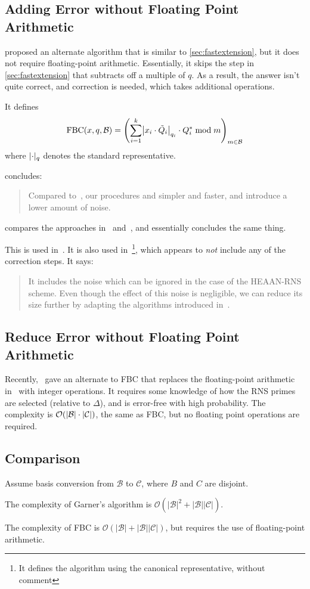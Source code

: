 \documentclass[../keyswitching.tex]{subfiles}
\begin{document}
\subsection{Adding Error without Floating Point Arithmetic}
\label{sec:basisExtErr}
\cite{cryptoeprint:2016/510} proposed an alternate algorithm that is similar to \cref{sec:fastextension}, but it does not require floating-point arithmetic. Essentially, it skips the step in \cref{sec:fastextension} that subtracts off a multiple of $q$. As a result, the answer isn't quite correct, and correction is needed, which takes additional operations.

It defines
\[\mathrm{FBC}(x,q,\mathcal{B}) = \parens*{
	\sum_{i=1}^k \abs*{x_i\cdot \tilde{Q}_i}_{q_i}\cdot Q_i^*\bmod m}_{m\in\mathcal{B}}\]
where $\lvert\cdot\rvert_q$ denotes the standard representative.

\cite{cryptoeprint:2018/117} concludes:

\blockquote{Compared to~\cite{cryptoeprint:2016/510}, our procedures and simpler and faster, and introduce a lower amount of noise.}

\cite{cryptoeprint:2018/589} compares the approaches in~\cite{cryptoeprint:2016/510} and~\cite{cryptoeprint:2018/117}, and essentially concludes the same thing.

This is used in~\cite{cryptoeprint:2018/931}. It is also used in~\cite{cryptoeprint:2019/688}\footnote{It defines the algorithm using the canonical representative, without comment}, which appears to \emph{not} include any of the correction steps. It says:

\blockquote{It includes the noise which can be ignored in the case of the \textrm{HEAAN-RNS} scheme. Even though the effect of this noise is negligible, we can reduce its size further by adapting the algorithms introduced in~\cite{cryptoeprint:2018/117}.}

\subsection{Reduce Error without Floating Point Arithmetic}
Recently,~\cite{cryptoeprint:2024/417} gave an alternate to FBC that replaces the floating-point arithmetic in~\cite{cryptoeprint:2018/117} with integer operations. It requires some knowledge of how the RNS primes are selected (relative to $\Delta$), and is error-free with high probability. The complexity is $\mathcal{O}(\lvert\mathcal{B}\rvert\cdot\lvert\mathcal{C}\rvert)$, the same as FBC, but no floating point operations are required.

\subsection{Comparison}
Assume basis conversion from $\mathcal{B}$ to $\mathcal{C}$, where $B$ and $C$ are disjoint.

The complexity of Garner's algorithm is $\mathcal{O}(|\mathcal{B}|^2+|\mathcal{B}||\mathcal{C}|)$.

The complexity of FBC is $\mathcal{O}(|\mathcal{B}|+|\mathcal{B}||\mathcal{C}|)$, but requires the use of floating-point arithmetic.

\ifcompileasbook
\else
\printbibliography
\fi
\end{document}
